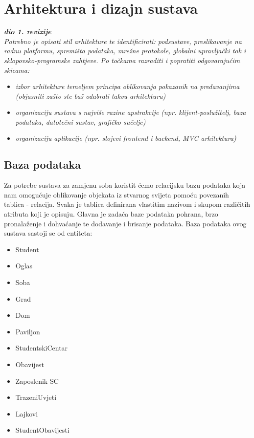 \chapter{Arhitektura i dizajn sustava}
		
		\textbf{\textit{dio 1. revizije}}\\

		\textit{ Potrebno je opisati stil arhitekture te identificirati: podsustave, preslikavanje na radnu platformu, spremišta podataka, mrežne protokole, globalni upravljački tok i sklopovsko-programske zahtjeve. Po točkama razraditi i popratiti odgovarajućim skicama:}
	\begin{itemize}
		\item 	\textit{izbor arhitekture temeljem principa oblikovanja pokazanih na predavanjima (objasniti zašto ste baš odabrali takvu arhitekturu)}
		\item 	\textit{organizaciju sustava s najviše razine apstrakcije (npr. klijent-poslužitelj, baza podataka, datotečni sustav, grafičko sučelje)}
		\item 	\textit{organizaciju aplikacije (npr. slojevi frontend i backend, MVC arhitektura) }		
	\end{itemize}

	
		

		

				
		\section{Baza podataka}
			
		Za potrebe sustava za zamjenu soba koristit ćemo relacijsku bazu podataka koja nam omogućuje oblikovanje objekata iz stvarnog svijeta pomoću povezanih tablica - relacija. Svaka je tablica definirana vlastitim nazivom i skupom različitih atributa koji je opisuju. Glavna je zadaća baze podataka pohrana, brzo pronalaženje i dohvaćanje te dodavanje i brisanje podataka. Baza podataka ovog sustava sastoji se od entiteta:
		\begin{itemize}
			\item Student
			\item Oglas
			\item Soba
			\item Grad
			\item Dom
			\item Paviljon
			\item StudentskiCentar
			\item Obavijest
			\item Zaposlenik SC
			\item TrazeniUvjeti
			\item Lajkovi
			\item StudentObavijesti
			
		\end{itemize}
		
